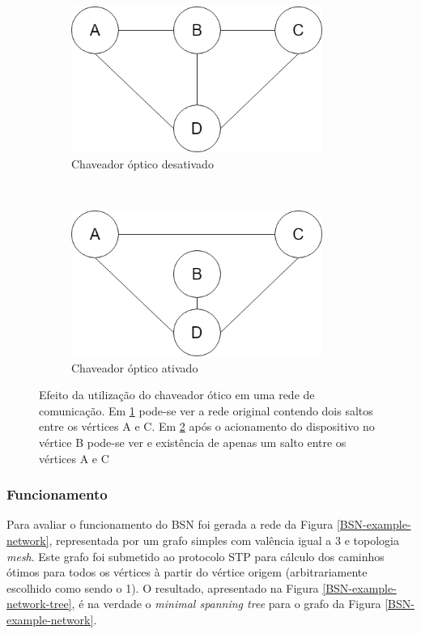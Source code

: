 \documentclass[conference]{IEEEtran}
\begin{document}
\begin{figure}[htbp]
	\centering
	\begin{subfigure}[t]{0.2\textwidth}
		\centering
		\includegraphics[width=0.9\textwidth]{./figuras/Bypass-exemplo-A.png} %
		\caption{Chaveador óptico desativado}
		\label{fig_bypass_exemplo_A}
	\end{subfigure}%
	~
	\begin{subfigure}[t]{0.2\textwidth}
		\centering
		\includegraphics[width=0.9\textwidth]{./figuras/Bypass-exemplo-B.png} %
	\caption{Chaveador óptico ativado}
	\label{fig_bypass_exemplo_B}
	\end{subfigure}
	\caption[Exemplo de atuação de \emph{by-pass} óptico]{Efeito da utilização do chaveador ótico em uma rede de comunicação. Em \ref{fig_bypass_exemplo_A} pode-se ver a rede original contendo dois saltos entre os vértices A e C. Em \ref{fig_bypass_exemplo_B} após o acionamento do dispositivo no vértice B pode-se ver e existência de apenas um salto entre os vértices A e C}
	\label{fig-bypass-exemplo}
\end{figure}

\subsubsection{Funcionamento}
Para avaliar o funcionamento do BSN foi gerada a rede da Figura \ref{BSN-example-network}, representada por um grafo simples com valência igual a 3 e topologia \emph{mesh}. Este grafo foi submetido ao protocolo STP para cálculo dos caminhos ótimos para todos os vértices à partir do vértice origem (arbitrariamente escolhido como sendo o 1). O resultado, apresentado na Figura \ref{BSN-example-network-tree}, é na verdade o \emph{minimal spanning tree} para o grafo da Figura \ref{BSN-example-network}.
\end{document}
